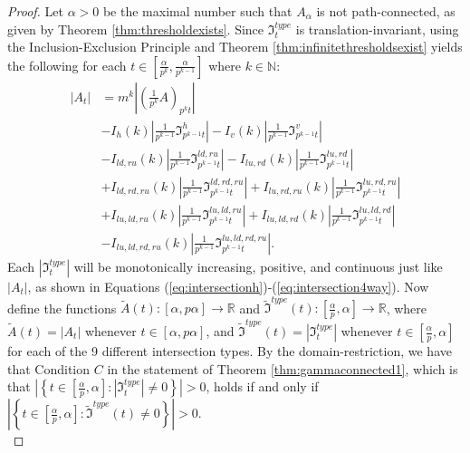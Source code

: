 \documentclass{article}
\theoremstyle{plain}
\numberwithin{equation}{section}
\numberwithin{table}{section}
\numberwithin{figure}{section}
\begin{document}
\begin{proof}
Let $\alpha > 0$ be the maximal number such that $A_{\alpha}$ is not path-connected, as given by Theorem \ref{thm:thresholdexists}. Since $\mathfrak{I}_t^{type}$ is translation-invariant, using the Inclusion-Exclusion Principle and Theorem \ref{thm:infinitethresholdsexist} yields the following for each $t \in \left[\frac{\alpha}{p^k}, \frac{\alpha}{p^{k-1}}\right]$ where $k \in \mathbb{N}$:
\begin{align}
|A_t| &=
m^k \left|\left(\frac{1}{p^k} A\right)_{p^k t}\right| \nonumber\\
&- I_{h}(k) \left|\frac{1}{p^{k-1}} \mathfrak{I}_{p^{k-1} t}^{h}\right| - I_{v}(k) \left|\frac{1}{p^{k-1}} \mathfrak{I}_{p^{k-1} t}^{v}\right| \nonumber\\& - I_{ld,ru}(k) \left|\frac{1}{p^{k-1}} \mathfrak{I}_{p^{k-1} t}^{ld,ru}\right| - I_{lu,rd}(k) \left|\frac{1}{p^{k-1}} \mathfrak{I}_{p^{k-1} t}^{lu,rd}\right| \nonumber\\
&+ I_{ld,rd,ru}(k) \left|\frac{1}{p^{k-1}} \mathfrak{I}_{p^{k-1} t}^{ld,rd,ru}\right| + I_{lu,rd,ru}(k) \left|\frac{1}{p^{k-1}} \mathfrak{I}_{p^{k-1} t}^{lu,rd,ru}\right|\nonumber\\& + I_{lu,ld,ru}(k) \left|\frac{1}{p^{k-1}} \mathfrak{I}_{p^{k-1} t}^{lu,ld,ru}\right| + I_{lu,ld,rd}(k) \left|\frac{1}{p^{k-1}} \mathfrak{I}_{p^{k-1} t}^{lu,ld,rd}\right| \nonumber\\
&- I_{lu,ld,rd,ru}(k) \left|\frac{1}{p^{k-1}} \mathfrak{I}_{p^{k-1} t}^{lu,ld,rd,ru}\right|.
\end{align}
Each $\left|\mathfrak{I}_t^{type}\right|$ will be monotonically increasing, positive, and continuous just like $|A_t|$, as shown in Equations (\ref{eq:intersectionh})-(\ref{eq:intersection4way}). Now define the functions $\tilde{A}(t) : [\alpha,p\alpha] \rightarrow \mathbb{R}$ and $\tilde{\mathfrak{I}}^{type}(t) : \left[\frac{\alpha}{p}, \alpha\right] \rightarrow \mathbb{R}$, where $\tilde{A}(t) = |A_t|$ whenever $t \in [\alpha,p\alpha]$, and $\tilde{\mathfrak{I}}^{type}(t) = |\mathfrak{I}_t^{type}|$ whenever $t \in \left[\frac{\alpha}{p}, \alpha\right]$ for each of the 9 different intersection types. By the domain-restriction, we have that Condition $C$ in the statement of Theorem \ref{thm:gammaconnected1}, which is that $\left|\left\{t \in \left[\frac{\alpha}{p},\alpha\right] : \left|\mathfrak{I}_t^{type}\right| \neq 0\right\}\right| > 0$, holds if and only if $\left|\left\{t \in \left[\frac{\alpha}{p},\alpha\right] : \tilde{\mathfrak{I}}^{type}(t) \neq 0\right\}\right| > 0$. \\


\end{proof}
\end{document}
